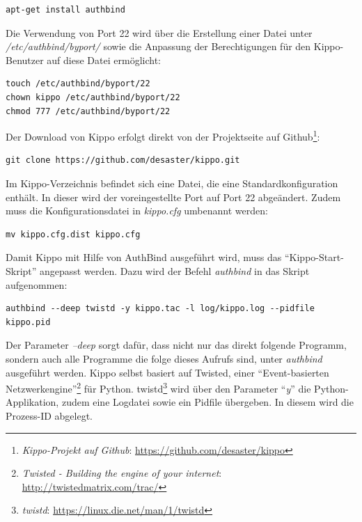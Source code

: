 \begin{lstlisting}[style=customc]
apt-get install authbind
\end{lstlisting}

Die Verwendung von Port 22 wird über die Erstellung einer Datei unter \textit{/etc/authbind/byport/} sowie die Anpassung der Berechtigungen für den Kippo-Benutzer auf diese Datei ermöglicht:

\begin{lstlisting}[style=customc]
touch /etc/authbind/byport/22
chown kippo /etc/authbind/byport/22
chmod 777 /etc/authbind/byport/22
\end{lstlisting}

Der Download von Kippo erfolgt direkt von der Projektseite auf Github\footnote{ \textit{Kippo-Projekt auf Github}: \url{https://github.com/desaster/kippo}}:

\begin{lstlisting}[style=customc]
git clone https://github.com/desaster/kippo.git
\end{lstlisting}

Im Kippo-Verzeichnis befindet sich eine Datei, die eine Standardkonfiguration enthält. In dieser wird der  voreingestellte Port auf Port 22 abgeändert. Zudem muss die Konfigurationsdatei in \textit{kippo.cfg} umbenannt werden:

\begin{lstlisting}[style=customc]
mv kippo.cfg.dist kippo.cfg
\end{lstlisting}

Damit Kippo mit Hilfe von AuthBind ausgeführt wird, muss das "`Kippo-Start-Skript"' angepasst werden. Dazu wird der Befehl \textit{authbind} in das Skript aufgenommen:

\begin{lstlisting}[style=customc]
authbind --deep twistd -y kippo.tac -l log/kippo.log --pidfile kippo.pid
\end{lstlisting}

Der Parameter \textit{--deep} sorgt dafür, dass nicht nur das direkt folgende Programm, sondern auch alle Programme die folge dieses Aufrufs sind, unter \textit{authbind} ausgeführt werden. Kippo selbst basiert auf Twisted, einer "`Event-basierten Netzwerkengine"'\footnote{ \textit{Twisted - Building the engine of your internet}: \url{http://twistedmatrix.com/trac/}} für Python. twistd\footnote{ \textit{twistd}: \url{https://linux.die.net/man/1/twistd}} wird über den Parameter "`\textit{y}"' die Python-Applikation, zudem eine Logdatei sowie ein Pidfile übergeben. In diesem wird die Prozess-ID abgelegt.

